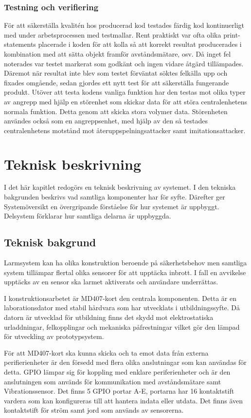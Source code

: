 \documentclass{article}
\begin{document}
\subsubsection{Testning och verifiering}
För att säkerställa kvalitén hos producerad kod testades färdig kod kontinuerligt med under arbetsprocessen med testmallar.
Rent praktiskt var ofta olika print-statements placerade i koden för att kolla så att korrekt resultat producerades i kombination med att sätta objekt framför avståndsmätare, osv.
Då inget fel noterades var testet markerat som godkänt och ingen vidare åtgärd tillämpades. 
Däremot när resultat inte blev som testet förväntat söktes felkälla upp och fixades omgående, sedan gjordes ett nytt test för att säkerställa fungerande produkt. 
Utöver att testa kodens vanliga funktion har den testas mot olika typer av angrepp med hjälp en störenhet som skickar data för att störa centralenhetens normala funktion. 
Detta genom att  skicka stora volymer data. 
Störenheten användes också som en angreppsenhet, med hjälp av den så testades centralenhetens motstånd mot återuppspelningsattacker samt imitationsattacker.

\newpage
\section{Teknisk beskrivning}
I det här kapitlet redogörs en teknisk beskrivning av systemet. 
I den tekniska bakgrunden beskrivs vad samtliga komponenter har för syfte. Därefter ger Systemöversikt en övergripande förståelse för hur systemet är uppbyggt. 
Delsystem förklarar hur samtliga delarna är uppbyggda.

\subsection{Teknisk bakgrund}
Larmsystem kan ha olika konstruktion beroende på säkerhetsbehov men samtliga system tillämpar flertal olika sensorer för att upptäcka inbrott. 
I fall en avvikelse upptäcks av en sensor ska larmet aktiverats och användare underrättas.

I konstruktionsarbetet är MD407-kort den centrala komponenten. 
Detta är en laborationsdator med stabil hårdvara som har utvecklats i utbildningssyfte. 
Då datorn är utvecklad för utbildning finns det skydd mot elektrostatiska urladdningar, felkopplingar och mekaniska påfrestningar vilket gör den lämpad för utveckling av prototypsystem.

För att MD407-kort ska kunna skicka och ta emot data från externa perifierienheter är den försedd med flera olika anslutningar som kan användas för detta. 
GPIO lämpar sig för koppling med enklare periferienheter och är den anslutningen som används för kommunikation med avståndsmätare samt Vibrationssensor. 
Det finns 5 GPIO portar A-E, portarna har 16 kontaktstift vardera som kan konfigureras till att hantera indata eller utdata. 
Det finns även kontaktstift för ström samt jord som används av sensorerna.
\end{document}
